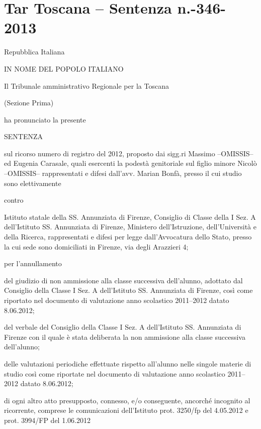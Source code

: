\chapter{Tar Toscana – Sentenza n.-346-2013}
\label{cha:TarToscanaSentenzan346_2013}
% 
\begin{center}
	Repubblica Italiana
	
	IN NOME DEL POPOLO ITALIANO
	
	Il Tribunale amministrativo Regionale per la Toscana
	
	(Sezione Prima)
\end{center}

ha pronunciato la presente 
\begin{center}
	SENTENZA
\end{center}
sul ricorso numero di registro del 2012, proposto dai sigg.ri Massimo --OMISSIS-- ed Eugenia Carasale, quali esercenti la podestà genitoriale sul figlio minore Nicolò --OMISSIS-- rappresentati e difesi dall'avv. Marian Bonfà, presso il cui studio sono elettivamente 
\begin{center}
	contro
\end{center}
Istituto statale della SS. Annunziata di Firenze, Consiglio di Classe della I Sez. A dell'Istituto SS. Annunziata di Firenze, Ministero dell'Istruzione, dell'Università e della Ricerca, rappresentati e difesi per legge dall'Avvocatura dello Stato, presso la cui sede sono domiciliati in Firenze, via degli Arazzieri 4;
\begin{center}
	per l'annullamento 
\end{center}
\begin{description}
	\item[--] del giudizio di non ammissione alla classe successiva dell'alunno, adottato dal Consiglio della Classe I Sez. A dell'Istituto SS. Annunziata di Firenze, così come riportato nel documento di valutazione anno scolastico 2011--2012 datato 8.06.2012;
	\item [--] del verbale del Consiglio della Classe I Sez. A dell'Istituto SS. Annunziata di Firenze con il quale è stata deliberata la non ammissione alla classe successiva dell'alunno; 
	\item [--] delle valutazioni periodiche effettuate rispetto all'alunno nelle singole materie di studio così come riportate nel documento di valutazione anno scolastico 2011--2012 datato 8.06.2012;
	\item di ogni altro atto presupposto, connesso, e/o conseguente, ancorché incognito al ricorrente, comprese le comunicazioni dell'Istituto prot. 3250/fp del 4.05.2012 e prot. 3994/FP del 1.06.2012
\end{description}


